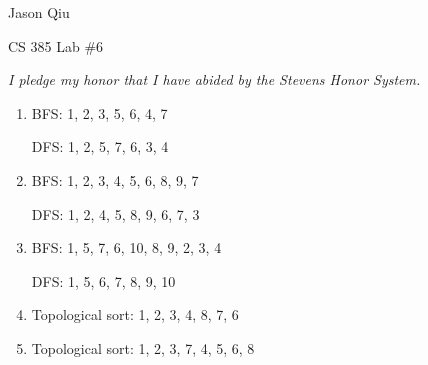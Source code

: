 \documentclass[a4paper,10pt]{article}
\begin{document}
Jason Qiu

CS 385 Lab $\#6$

\emph{I pledge my honor that I have abided by the Stevens Honor System.}

\begin{enumerate}[1.]
\item BFS: 1, 2, 3, 5, 6, 4, 7

DFS: 1, 2, 5, 7, 6, 3, 4

\item BFS: 1, 2, 3, 4, 5, 6, 8, 9, 7

DFS: 1, 2, 4, 5, 8, 9, 6, 7, 3

\item BFS: 1, 5, 7, 6, 10, 8, 9, 2, 3, 4

DFS: 1, 5, 6, 7, 8, 9, 10

\item Topological sort: 1, 2, 3, 4, 8, 7, 6
\item Topological sort: 1, 2, 3, 7, 4, 5, 6, 8
\end{enumerate}
\end{document}
